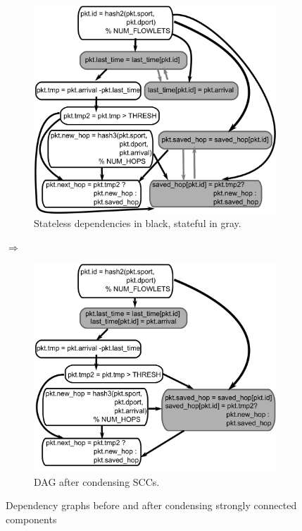 \begin{figure}[!t]
\begin{subfigure}{\columnwidth}
  \includegraphics[width=0.98\columnwidth]{deps.pdf}
  \caption{Stateless dependencies in black, stateful in gray.}
  \label{fig:partitioning_before}
\end{subfigure}
\textbf{$\Longrightarrow$ }
\begin{subfigure}{\columnwidth}
\includegraphics[width=0.98\columnwidth]{scc.pdf}
\caption{DAG after condensing SCCs.}
\label{fig:partitioning_after}
\end{subfigure}
\caption{Dependency graphs before and after condensing strongly connected components}
\label{fig:pipelining}
\end{figure}




